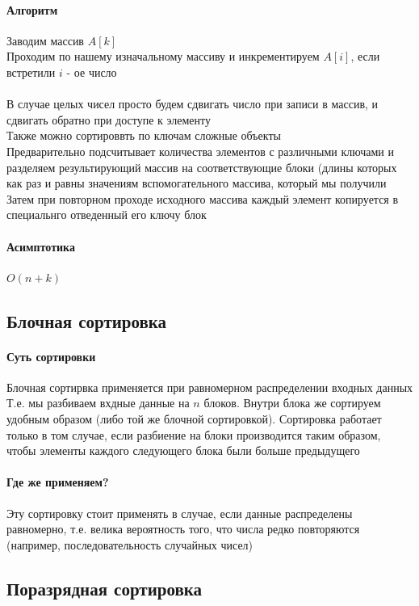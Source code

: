 \documentclass[a4paper,10pt]{article}
\begin{document}
	\paragraph{Алгоритм}
	Заводим массив $A[k]$ \\
	Проходим по нашему изначальному массиву и инкрементируем $A[i]$, если встретили $i$ - ое число \\
	\\ В случае целых чисел просто будем сдвигать число при записи в массив, и сдвигать обратно при доступе к элементу \\
	Также можно сортироввть по ключам сложные объекты \\
	Предварительно подсчитывает количества элементов с различными ключами и разделяем результирующий массив на соответствующие блоки (длины которых как раз и равны значениям вспомогательного массива, который мы получили \\
	Затем при повторном проходе исходного массива каждый элемент копируется в специальнго отведенный его ключу блок \\
	\paragraph{Асимптотика}
	$O(n+k)$
	\subsection{Блочная сортировка}
	\paragraph{Суть сортировки}
	Блочная сортирвка применяется при равномерном распределении входных данных \\
	Т.е. мы разбиваем вхдные данные на $n$ блоков. Внутри блока же сортируем удобным образом (либо той же блочной сортировкой). Сортировка работает только в том случае, если разбиение на блоки производится таким образом, чтобы элементы каждого следующего блока были больше предыдущего
	\paragraph{Где же применяем?}
	Эту сортировку стоит применять в случае, если данные распределены равномерно, т.е. велика вероятность того, что числа редко повторяются (например, последовательность случайных чисел) \\
	\subsection{Поразрядная сортировка}
\end{document}
